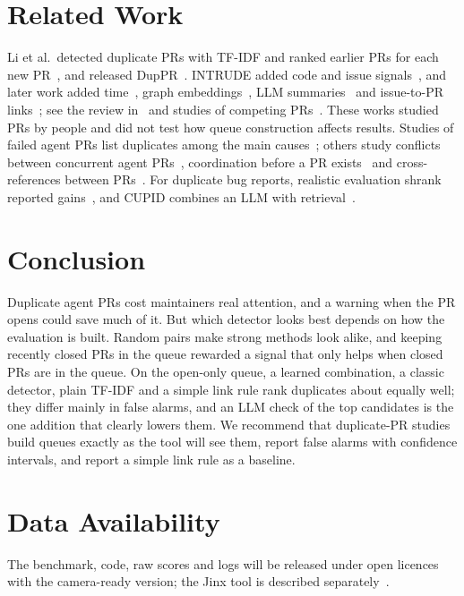 \documentclass[10pt,conference]{IEEEtran}
\begin{document}
\section{Related Work}
Li et al.\ detected duplicate PRs with TF-IDF and ranked earlier PRs for each new PR~\cite{li2017detecting}, and released DupPR~\cite{yu2018dataset}. INTRUDE added code and issue signals~\cite{ren2019intrude}, and later work added time~\cite{wang2019time}, graph embeddings~\cite{jiang2023duphunter}, LLM summaries~\cite{liao2024dupllm} and issue-to-PR links~\cite{galbraith2025duplicate}; see the review in~\cite{benchekaya2026slr} and studies of competing PRs~\cite{zhang2018competing,li2022redundancy}. These works studied PRs by people and did not test how queue construction affects results. Studies of failed agent PRs list duplicates among the main causes~\cite{ehsani2026fail,alam2026unmerged,nakashima2026rejected,abujadallah2026rejection}; others study conflicts between concurrent agent PRs~\cite{xu2026conflicts}, coordination before a PR exists~\cite{sarkar2026before} and cross-references between PRs~\cite{khemissi2026humans}. For duplicate bug reports, realistic evaluation shrank reported gains~\cite{zhang2023howfar}, and CUPID combines an LLM with retrieval~\cite{cupid2023}.

\section{Conclusion}
Duplicate agent PRs cost maintainers real attention, and a warning when the PR opens could save much of it. But which detector looks best depends on how the evaluation is built. Random pairs make strong methods look alike, and keeping recently closed PRs in the queue rewarded a signal that only helps when closed PRs are in the queue. On the open-only queue, a learned combination, a classic detector, plain TF-IDF and a simple link rule rank duplicates about equally well; they differ mainly in false alarms, and an LLM check of the top candidates is the one addition that clearly lowers them. We recommend that duplicate-PR studies build queues exactly as the tool will see them, report false alarms with confidence intervals, and report a simple link rule as a baseline.

\section*{Data Availability}
The benchmark, code, raw scores and logs will be released under open licences with the camera-ready version; the Jinx tool is described separately~\cite{jinxtool}.


\end{document}

